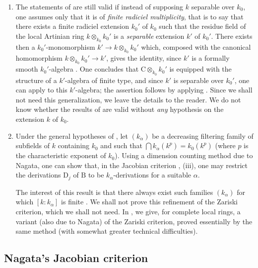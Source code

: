 \begin{remark}[22.6.9]
\label{0.22.6.9}
\begin{enumerate}
  \item[\rm{(i)}] The statements of  are still valid if instead of supposing $k$ separable over $k_0$, one assumes only that it is of \emph{finite radiciel multiplicity}, that is to say  that there exists a finite radiciel extension $k_0'$ of $k_0$ such that the residue field of the local Artinian ring $k\otimes_{k_0}k_0'$ is a \emph{separable} extension $k'$ of $k_0'$.
  There exists then a $k_0'$-monomorphism
  $k'\to k\otimes_{k_0}k_0'$ which, composed with the canonical homomorphism
  $k\otimes_{k_0}k_0'\to k'$, gives the identity, since $k'$ is a formally
  smooth $k_0'$-algebra . One concludes that
  $\mathrm{C}\otimes_{k_0}k_0'$ is equipped with the structure of a
  $k'$-algebra of finite type, and since $k'$ is separable over $k_0'$, one
  can apply  to this $k'$-algebra; the assertion follows by
  applying . Since we shall not need this generalization, we
  leave the details to the reader.
  We do not know whether the results of  are valid without \emph{any} hypothesis on the extension $k$ of $k_0$.
  \item[\rm{(ii)}] Under the general hypotheses of , let $(k_\alpha)$ be a decreasing filtering family of subfields of $k$ containing $k_0$ and such that $\bigcap k_\alpha(k^p)=k_0(k^p)$ (where $p$ is the characteristic exponent of $k_0$).
  Using a dimension counting method due to Nagata, one can show that, in the
  Jacobian criterion , (iii), one may restrict the derivations
  $\mathrm{D}_j$ of $\mathrm{B}$ to be $k_\alpha$-derivations for a suitable
  $\alpha$.


  The interest of this result is that there always exist such families
  $(k_\alpha)$ for which $[k:k_\alpha]$ is finite . We shall
  not prove this refinement of the Zariski criterion, which we shall not need.
  In , we give, for complete local rings, a variant (also due to
  Nagata) of the Zariski criterion, proved essentially by the same method
  (with somewhat greater technical difficulties).
\end{enumerate}
\end{remark}

\subsection{Nagata's Jacobian criterion}
\label{subsection:0.22.7}

